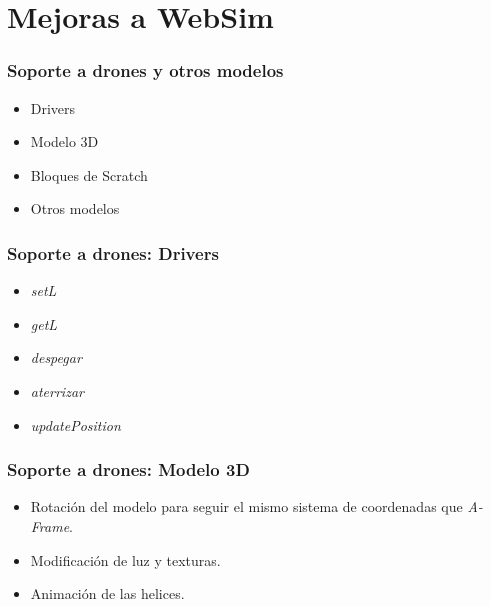 \documentclass[xcolor={table}]{beamer}
\begin{document}
	\section{Mejoras a WebSim}
		\begin{frame}
			\frametitle{Soporte a drones y otros modelos}
				\begin{itemize}
				\item Drivers
				\item Modelo 3D
				\item Bloques de Scratch
				\item Otros modelos 
			\end{itemize}
		\end{frame}
			\begin{frame}
			\frametitle{Soporte a drones: Drivers}
			\begin{itemize}
				\item \textit{setL}
				\item \textit{getL}
				\item \textit{despegar}
				\item \textit{aterrizar}
				\item \textit{updatePosition}
			\end{itemize}
		\end{frame}
				
    	\begin{frame}
			\frametitle{Soporte a drones: Modelo 3D}
            \begin{itemize}
                \item Rotación del modelo para seguir el mismo sistema de coordenadas que \textit{A-Frame}.
                \item Modificación de luz y texturas. \item Animación de las helices. 
            \end{itemize}
    	\end{frame}
    	
\end{document}
